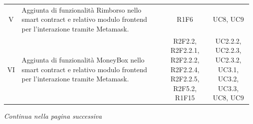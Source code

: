\begin{table}[H]
\begin{tabular}{c|p{6cm}|c|c}
    V   & Aggiunta di funzionalità Rimborso nello smart contract\glo{} e relativo modulo frontend\glo{} per l'interazione tramite Metamask\glo{}.                                     & R1F6                               & UC8, UC9 \\
    VI  & Aggiunta di funzionalità MoneyBox\glo{} nello smart contract\glo{} e relativo modulo frontend\glo{} per l'interazione tramite Metamask\glo{}.                               & \Shortunderstack{R2F2.2, R2F2.2.1,            \\R2F2.2.2, R2F2.2.4,\\R2F2.2.5, R2F5.2,\\R1F15\\} & \Shortunderstack{UC2.2.2, UC2.2.3,\\UC2.3.2, UC3.1,\\UC3.2, UC3.3,\\UC8, UC9\\}\\
  \end{tabular}
\end{table}
\begin{center}
  \textit{\small Continua nella pagina successiva}
\end{center}
